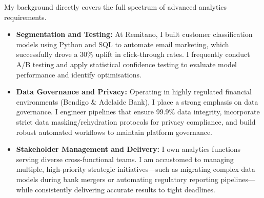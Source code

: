 \documentclass[11pt, a4paper]{article}
\begin{document}
My background directly covers the full spectrum of advanced analytics requirements. 
\begin{itemize}
    \item \textbf{Segmentation and Testing:} At Remitano, I built customer classification models using Python and SQL to automate email marketing, which successfully drove a 30\% uplift in click-through rates. I frequently conduct A/B testing and apply statistical confidence testing to evaluate model performance and identify optimisations.
    \item \textbf{Data Governance and Privacy:} Operating in highly regulated financial environments (Bendigo \& Adelaide Bank), I place a strong emphasis on data governance. I engineer pipelines that ensure 99.9\% data integrity, incorporate strict data masking/rehydration protocols for privacy compliance, and build robust automated workflows to maintain platform governance.
    \item \textbf{Stakeholder Management and Delivery:} I own analytics functions serving diverse cross-functional teams. I am accustomed to managing multiple, high-priority strategic initiatives---such as migrating complex data models during bank mergers or automating regulatory reporting pipelines---while consistently delivering accurate results to tight deadlines.
\end{itemize}
\end{document}
